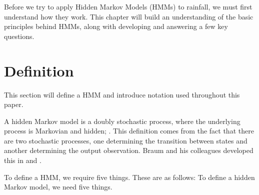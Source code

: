 
Before we try to apply Hidden Markov Models (HMMs) to rainfall, we must first understand how they work. This chapter will build an understanding of the basic principles behind HMMs, along with developing and answering a few key questions.

\section{Definition}
\label{Hidden_Markov:Definition}

This section will define a HMM and introduce notation used throughout this paper. 

A hidden Markov model is a doubly stochastic process, where the underlying process is Markovian and hidden; \cite{Rabiner1986}. This definition comes from the fact that there are two stochastic processes, one determining the transition between states and another determining the output observation. Braum and his colleagues developed this in \cite{Baum1967} and \cite{Baum1966}. 

To define a HMM, we require five things. These are as follows:
To define a hidden Markov model, we need five things.

